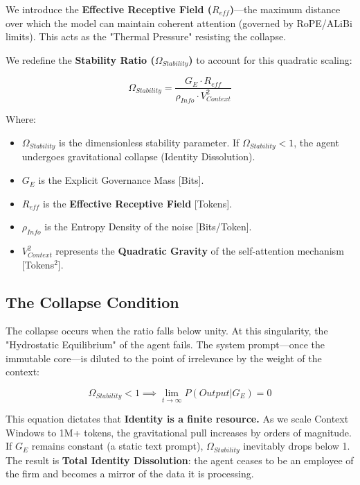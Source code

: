 \documentclass[11pt, a4paper]{article}
\newcommand{\Ge}{G_E}
\newcommand{\Vctx}{V_{Context}}
\newcommand{\OmegaStab}{\Omega_{Stability}}
\begin{document}
We introduce the \textbf{Effective Receptive Field ($R_{eff}$)}—the maximum distance over which the model can maintain coherent attention (governed by RoPE/ALiBi limits). This acts as the "Thermal Pressure" resisting the collapse.

We redefine the \textbf{Stability Ratio ($\OmegaStab$)} to account for this quadratic scaling:

\begin{equation}
    \label{eq:critical_density}
    \OmegaStab = \frac{\Ge \cdot R_{eff}}{\rho_{Info} \cdot \Vctx^2}
\end{equation}

\noindent
Where:
\begin{itemize}
    \item \textbf{$\OmegaStab$} is the dimensionless stability parameter. If $\OmegaStab < 1$, the agent undergoes gravitational collapse (Identity Dissolution).
    \item \textbf{$\Ge$} is the Explicit Governance Mass [Bits].
    \item \textbf{$R_{eff}$} is the \textbf{Effective Receptive Field} [Tokens].
    \item \textbf{$\rho_{Info}$} is the Entropy Density of the noise [Bits/Token].
    \item \textbf{$\Vctx^2$} represents the \textbf{Quadratic Gravity} of the self-attention mechanism [Tokens$^2$].
\end{itemize}

\subsection{The Collapse Condition}

The collapse occurs when the ratio falls below unity. At this singularity, the "Hydrostatic Equilibrium" of the agent fails. The system prompt---once the immutable core---is diluted to the point of irrelevance by the weight of the context:

\begin{equation}
    \label{eq:collapse_condition}
    \OmegaStab < 1 \implies \lim_{t \to \infty} P(Output | \Ge) = 0
\end{equation}

This equation dictates that \textbf{Identity is a finite resource.} As we scale Context Windows to 1M+ tokens, the gravitational pull increases by orders of magnitude. If $\Ge$ remains constant (a static text prompt), $\OmegaStab$ inevitably drops below 1. The result is \textbf{Total Identity Dissolution}: the agent ceases to be an employee of the firm and becomes a mirror of the data it is processing.
\end{document}
